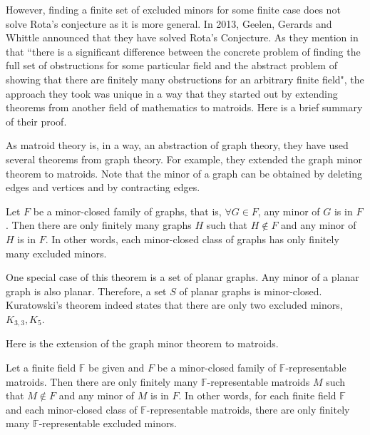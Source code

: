 However, finding a finite set of excluded minors for some finite case does not solve Rota's conjecture as it is more general.
In 2013, Geelen, Gerards and Whittle announced that they have solved Rota's Conjecture.
As they mention in \cite{solving} that ``there is a significant difference between the concrete problem of finding the full set of obstructions for some particular field and the abstract problem of showing that there are finitely many obstructions for an arbitrary finite field",
the approach they took was unique in a way that they started out by extending theorems from another field of mathematics to matroids.
Here is a brief summary of their proof.

As matroid theory is, in a way, an abstraction of graph theory, they have used several theorems from graph theory.
For example, they extended the graph minor theorem to matroids.
Note that the minor of a graph can be obtained by deleting edges and vertices and by contracting edges.

\begin{thm}
Let $F$ be a minor-closed family of graphs, that is, $\forall G \in F$, any minor of $G$ is in $F$.
Then there are only finitely many graphs $H$ such that $H \notin F$ and any minor of $H$ is in $F$.
In other words, each minor-closed class of graphs has only finitely many excluded minors.
\end{thm}

One special case of this theorem is a set of planar graphs.
Any minor of a planar graph is also planar.
Therefore, a set $S$ of planar graphs is minor-closed.
Kuratowski's theorem indeed states that there are only two excluded minors, $K_{3, 3}, K_5$.

Here is the extension of the graph minor theorem to matroids.

\begin{thm} 
Let a finite field $\mathbb{F}$ be given and $F$ be a minor-closed family of $\mathbb{F}$-representable matroids.
Then there are only finitely many $\mathbb{F}$-representable matroids $M$ such that $M \notin F$ and any minor of $M$ is in $F$.
In other words, for each finite field $\mathbb{F}$ and each minor-closed class of $\mathbb{F}$-representable matroids, there are only finitely many $\mathbb{F}$-representable excluded minors.
\end{thm}

